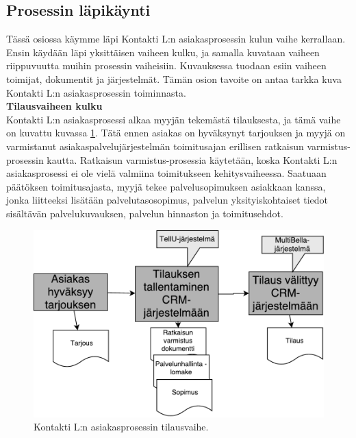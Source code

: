 \documentclass[finnish,12pt,a4paper,pdftex]{article}
\begin{document}




\subsection{Prosessin läpikäynti}

Tässä osiossa käymme läpi Kontakti L:n asiakasprosessin kulun vaihe kerrallaan. Ensin käydään läpi yksittäisen vaiheen kulku, ja samalla kuvataan vaiheen riippuvuutta muihin prosessin vaiheisiin. Kuvauksessa tuodaan esiin vaiheen toimijat, dokumentit ja järjestelmät. Tämän osion tavoite on antaa tarkka kuva Kontakti L:n asiakasprosessin toiminnasta. \\

\textbf{Tilausvaiheen kulku}\\


Kontakti L:n asiakasprosessi alkaa myyjän tekemästä tilauksesta, ja tämä vaihe on kuvattu kuvassa \ref{fig:tilaus}. Tätä ennen asiakas on hyväksynyt tarjouksen ja myyjä on varmistanut asiakaspalvelujärjestelmän toimitusajan erillisen ratkaisun varmistus-prosessin kautta. Ratkaisun varmistus-prosessia käytetään, koska Kontakti L:n asiakasprosessi ei ole vielä valmiina toimitukseen kehitysvaiheessa. Saatuaan päätöksen toimitusajasta, myyjä tekee palvelusopimuksen asiakkaan kanssa, jonka liitteeksi lisätään palvelutasosopimus, palvelun yksityiskohtaiset tiedot sisältävän palvelukuvauksen, palvelun hinnaston ja toimitusehdot.

\begin{figure}[!h]
    \centering
    \includegraphics[scale=0.4]{images/tilaus.pdf}
    \caption{Kontakti L:n asiakasprosessin tilausvaihe.}
    \label{fig:tilaus}
\end{figure}
\end{document}

